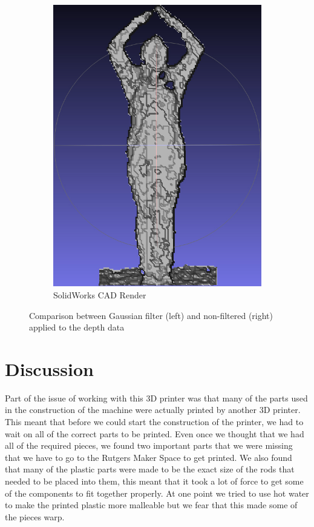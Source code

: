 \documentclass[pdftex,10.5pt]{report}
\begin{document}
\begin{figure}
\begin{subfigure}[H]{0.4\textwidth}
        \includegraphics[width=\textwidth]{figures/unfiltered}
        \caption{SolidWorks CAD Render}
    \end{subfigure}
    \caption{
        Comparison between Gaussian filter (left) and non-filtered (right) applied to the depth data
    }
    \label{fig:cad}
\end{figure}

\section{Discussion}
Part of the issue of working with this 3D printer was that many of the parts used in the construction of the machine were actually printed by another 3D printer. This meant that before we could start the construction of the printer, we had to wait on all of the correct parts to be printed. Even once we thought that we had all of the required pieces, we found two important parts that we were missing that we have to go to the Rutgers Maker Space to get printed. We also found that many of the plastic parts were made to be the exact size of the rods that needed to be placed into them, this meant that it took a lot of force to get some of the components to fit together properly. At one point we tried to use hot water to make the printed plastic more malleable but we fear that this made some of the pieces warp.
\end{document}
